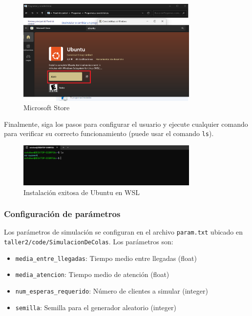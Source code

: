 \documentclass{article}
\begin{document}
\begin{enumerate}
    \begin{figure}[H]
    \centering
    \includegraphics[width=0.8\textwidth]{images/manualUsuarioErlangBC_8.png}
    \caption{Microsoft Store}
    \label{fig:store_mm1}
    \end{figure}

    Finalmente, siga los pasos para configurar el usuario y ejecute cualquier comando para verificar su correcto funcionamiento (puede usar el comando \texttt{ls}).

    \begin{figure}[H]
    \centering
    \includegraphics[width=0.8\textwidth]{images/manualUsuarioErlangBC_9.png}
    \caption{Instalación exitosa de Ubuntu en WSL}
    \label{fig:instalacion_wsl_mm1}
    \end{figure}
\end{enumerate}

\subsubsection{Configuración de parámetros}
Los parámetros de simulación se configuran en el archivo \texttt{param.txt} ubicado en \texttt{taller2/code/SimulacionDeColas}. Los parámetros son:

\begin{itemize}
    \item \texttt{media\_entre\_llegadas}: Tiempo medio entre llegadas (float)
    \item \texttt{media\_atencion}: Tiempo medio de atención (float)
    \item \texttt{num\_esperas\_requerido}: Número de clientes a simular (integer)
    \item \texttt{semilla}: Semilla para el generador aleatorio (integer)
\end{itemize}
\end{document}
